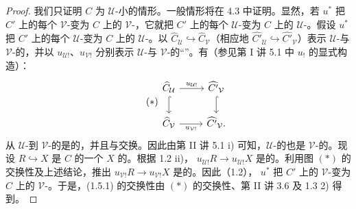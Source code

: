 \begin{proof}
我们只证明 $C$ 为 $\mathcal U$-小的情形。一般情形将在 4.3 中证明。显然，若 $u^*$ 把 $C'$ 上的每个
$\mathcal V$-变为 $C$ 上的 $\mathcal V$-，它就把 $C'$ 上的每个 $\mathcal U$-变为 $C$ 上的 $\mathcal U$-。假设 $u^*$ 把 $C'$ 上的每个 $\mathcal U$-变为 $C$ 上的 $\mathcal U$-。以 $\widehat C_{\mathcal U}\hookrightarrow\widehat C_{\mathcal V}$（相应地 $\widehat {C'}_{\mathcal U}\hookrightarrow\widehat {C'}_{\mathcal V}$）表示 $\mathcal U$-与 $\mathcal V$-的，并以 $u_{\mathcal U!}$、$u_{\mathcal V!}$ 分别表示 $\mathcal U$-与 $\mathcal V$-的“”。有（参见第 I 讲 5.1 中 $u_!$ 的显式构造）：
\begin{equation}\tag{$*$}
\begin{tikzcd}
 \widehat C_{\mathcal U}\arrow[r,"u_{\mathcal U!}"]\arrow[d,hook]&\widehat {C'}_{\mathcal V}\arrow[d,hook]\\
 \widehat C_{\mathcal V}\arrow[r,"u_{\mathcal V!}"']&\widehat {C'}_{\mathcal V}.
\end{tikzcd}
\end{equation}
从 $\mathcal U$-到 $\mathcal V$-的是的，并且与交换。因此由第 II 讲 5.1 i) 可知，$\mathcal U$-的也是 $\mathcal V$-的。现设 $R\hookrightarrow X$ 是 $C$ 的一个 $X$ 的。根据 1.2 ii)， $u_{\mathcal U!}R\to u_{\mathcal U!}X$ 是的。利用图 $(*)$ 的交换性及上述结论，推出 $u_{\mathcal V!}R\to u_{\mathcal V!}X$ 是的。因此（1.2）， $u^*$ 把 $C'$ 上的 $\mathcal V$-变为 $C$ 上的 $\mathcal V$-。于是，(1.5.1) 的交换性由 $(*)$ 的交换性、第 II 讲 3.6 及 1.3 2) 得到。
\end{proof}

